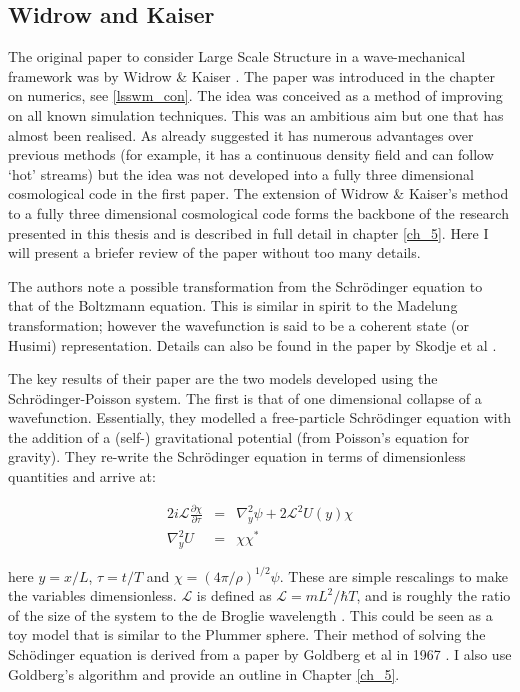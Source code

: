 \subsection{Widrow and Kaiser}
The original paper to consider Large Scale Structure in a wave-mechanical framework was by Widrow \& Kaiser \citep{bib_wk}. The paper was introduced in the chapter on numerics, see \ref{lsswm_con}. The idea was conceived as a method of improving on all known simulation techniques. This was an ambitious aim but one that has almost been realised. As already suggested it has numerous advantages over previous methods (for example, it has a continuous density field and can follow `hot' streams) but the idea was not developed into a fully three dimensional cosmological code in the first paper. The extension of Widrow \& Kaiser's method to a fully three dimensional cosmological code forms the backbone of the research presented in this thesis and is described in full detail in chapter \ref{ch_5}. Here I will present a briefer review of the paper without too many details.

The authors note a possible transformation from the Schr\"odinger equation to that of the Boltzmann equation. This is similar in spirit to the Madelung transformation; however the wavefunction is said to be a coherent state (or Husimi) representation. Details can also be found in the paper by Skodje et al \citep{bib_skod}.

The key results of their paper are the two models developed using the Schr\"odinger-Poisson system. The first is that of one dimensional collapse of a wavefunction. Essentially, they modelled a free-particle Schr\"odinger equation with the addition of a (self-) gravitational potential (from Poisson's equation for gravity). They re-write the Schr\"odinger equation in terms of dimensionless quantities and arrive at:

\begin{eqnarray}
2i\mathcal{L} \frac{\partial\chi}{\partial \tau} &=& \nabla_y^2\psi + 2\mathcal{L}^2 U(y)\chi \\
\nabla_y^2 U &=& \chi\chi^*
\end{eqnarray}

\noindent here $y = x/L$, $\tau = t/T$ and $\chi = (4\pi/\rho)^{1/2}\psi$. These are simple rescalings to make the variables dimensionless. $\mathcal{L}$ is defined as $\mathcal{L} = mL^2/\hbar T$, and is roughly the ratio of the size of the system to the de Broglie wavelength \citep{bib_wk}. This could be seen as a toy model that is similar to the Plummer sphere. Their method of solving the Sch\"odinger equation is derived from a paper by Goldberg et al in 1967 \citep{bib_gold}. I also use Goldberg's algorithm and provide an outline in Chapter \ref{ch_5}.

